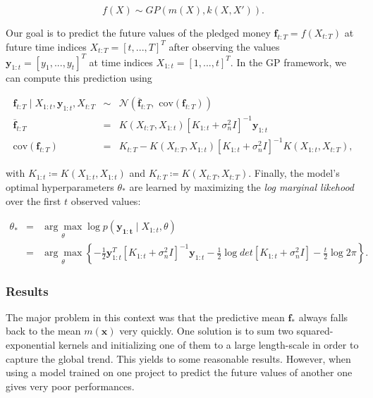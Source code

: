 \documentclass[11pt, oneside]{article}   	%
\begin{document}
                    \begin{equation}
                    		f(X) \sim GP \left( m(X), k(X, X') \right). 
                    \end{equation}
                    
                    Our goal is to predict the future values of the pledged money $\mathbf{f}_{t:T} = f(X_{t:T})$ at future time indices $X_{t:T} = [t, ..., T]^T$ after observing the values $\mathbf{y}_{1:t} = [y_1, ..., y_t]^T$ at time indices $X_{1:t} = [1, ..., t]^T$. In the GP framework, we can compute this prediction using
                    
                    \begin{eqnarray}
            			\mathbf{f}_{t:T}  \mid X_{1:t}, \mathbf{y}_{1:t}, X_{t:T} 	& \sim & 	\mathcal{N}\left(\overline{\mathbf{f}}_{t:T}, \text{ cov}(\mathbf{f}_{t:T})  \right) \\ 
           			\overline{\mathbf{f}}_{t:T}							& = & 	K(X_{t:T}, X_{1:t}) \left[ K_{1:t} + \sigma_n^2I \right]^{-1}\mathbf{y}_{1:t} \label{eq:predictive_mean} \\
           			\text{cov}(\mathbf{f}_{t:T}) 						& = & 	K_{t:T} - K(X_{t:T}, X_{1:t})\left[ K_{1:t} + \sigma_n^2I \right]^{-1}K(X_{1:t}, X_{t:T}) \label{eq:predictive_variance},
                    \end{eqnarray}
                    
                    with $K_{1:t} \coloneqq K(X_{1:t}, X_{1:t})$ and $K_{t:T} \coloneqq K(X_{t:T}, X_{t:T})$. Finally, the model's optimal hyperparameters $\theta_*$ are learned by maximizing the \textit{log marginal likehood} over the first $t$ observed values:
                    
                    \begin{eqnarray}
                    		\theta_* 	&=& \underset{\theta} {\arg\max} \log p(\mathbf{y_{1:t}} \mid X_{1:t}, \theta) \\
    						&=& \underset{\theta} {\arg\max} \left\{ -\frac{1}{2}\mathbf{y}_{1:t}^T \left[ K_{1:t}+ \sigma_n^2I \right]^{-1}\mathbf{y}_{1:t} -\frac{1}{2}\log det\left[K_{1:t}+ \sigma_n^2I\right] -\frac{t}{2}\log 2\pi \right\} \label{eq:arg_max_log_marginal_likelihood}.
                    \end{eqnarray}
                                                   
		\subsubsection*{Results}
            		The major problem in this context was that the predictive mean $\mathbf{f}_*$ always falls back to the mean $m(\mathbf{x})$ very quickly. One solution is to sum two squared-exponential kernels and initializing one of them to a large length-scale in order to capture the global trend. This yields to some reasonable results. However, when using a model trained on one project to predict the future values of another one gives very poor performances.
           
\end{document}
